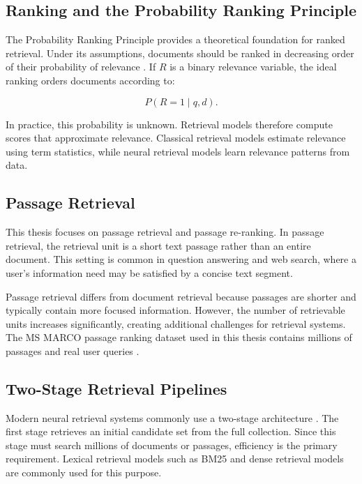 \subsection{Ranking and the Probability Ranking Principle}
\label{subsec:background_prp}

The Probability Ranking Principle provides a theoretical foundation for ranked retrieval. Under its assumptions, documents should be ranked in decreasing order of their probability of relevance \cite{manning2008ir}. If $R$ is a binary relevance variable, the ideal ranking orders documents according to:

\begin{equation}
    P(R=1 \mid q,d).
\end{equation}

In practice, this probability is unknown. Retrieval models therefore compute scores that approximate relevance. Classical retrieval models estimate relevance using term statistics, while neural retrieval models learn relevance patterns from data.

\subsection{Passage Retrieval}
\label{subsec:background_passage}

This thesis focuses on passage retrieval and passage re-ranking. In passage retrieval, the retrieval unit is a short text passage rather than an entire document. This setting is common in question answering and web search, where a user's information need may be satisfied by a concise text segment.

Passage retrieval differs from document retrieval because passages are shorter and typically contain more focused information. However, the number of retrievable units increases significantly, creating additional challenges for retrieval systems. The MS MARCO passage ranking dataset used in this thesis contains millions of passages and real user queries \cite{nguyen2016msmarco}.

\subsection{Two-Stage Retrieval Pipelines}
\label{subsec:background_two_stage}

Modern neural retrieval systems commonly use a two-stage architecture \cite{lin2021pretrained}. The first stage retrieves an initial candidate set from the full collection. Since this stage must search millions of documents or passages, efficiency is the primary requirement. Lexical retrieval models such as BM25 and dense retrieval models are commonly used for this purpose.

